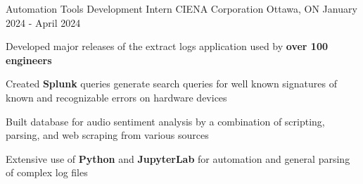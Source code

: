 

\begin{cventries}




	\cventry
	{Automation Tools Development Intern} %
	{CIENA Corporation} %
	{Ottawa, ON} %
	{January 2024 - April 2024} %
	{
		\begin{cvitems} %
      \item {Developed major releases of the extract logs application used by \textbf{over 100 engineers}}
			\item {Created \textbf{Splunk} queries generate search queries for well known signatures of known and recognizable errors on hardware devices}
      \item {Built database for audio sentiment analysis by a combination of scripting, parsing, and web scraping from various sources}
			\item {Extensive use of \textbf{Python} and \textbf{JupyterLab} for automation and general parsing of complex log files}
		\end{cvitems}
	}


\end{cventries}
